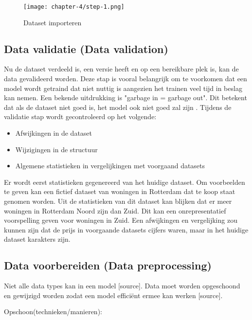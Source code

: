 \begin{figure}[hbt!]
  \centering
  \texttt{[image: chapter-4/step-1.png]}
  \caption{Dataset importeren}
  \label{fig:step-1}
\end{figure}

\subsection{Data validatie (Data validation)}\label{subsec:data-validatie}
Nu de dataset verdeeld is, een versie heeft en op een bereikbare plek is, kan de data gevalideerd worden. Deze stap is vooral belangrijk om te voorkomen dat een model wordt getraind dat niet nuttig is aangezien het trainen veel tijd in beslag kan nemen. Een bekende uitdrukking is "garbage in = garbage out". Dit betekent dat als de dataset niet goed is, het model ook niet goed zal zijn \cite[p.~43]{building-machine-learning-pipelines-oreilly}. Tijdens de validatie stap wordt gecontroleerd op het volgende:

\begin{itemize}
  \item Afwijkingen in de dataset
  \item Wijzigingen in de structuur
  \item Algemene statistieken in vergelijkingen met voorgaand datasets \cite[p.~44]{building-machine-learning-pipelines-oreilly}
\end{itemize}

Er wordt eerst statistieken gegenereerd van het huidige dataset. Om voorbeelden te geven kan een fictief dataset van woningen in Rotterdam dat te koop staat genomen worden. Uit de statistieken van dit dataset kan blijken dat er meer woningen in Rotterdam Noord zijn dan Zuid. Dit kan een onrepresentatief voorspelling geven voor woningen in Zuid. Een afwijkingen en vergelijking zou kunnen zijn dat de prijs in voorgaande datasets cijfers waren, maar in het huidige dataset karakters zijn.

\subsection{Data voorbereiden (Data preprocessing)}\label{subsec:data-voorbereiden}

Niet alle data types kan in een model [source]. Data moet worden opgeschoond en gewijzigd worden zodat een model efficiënt ermee kan werken [source].

Opschoon(technieken/manieren):

